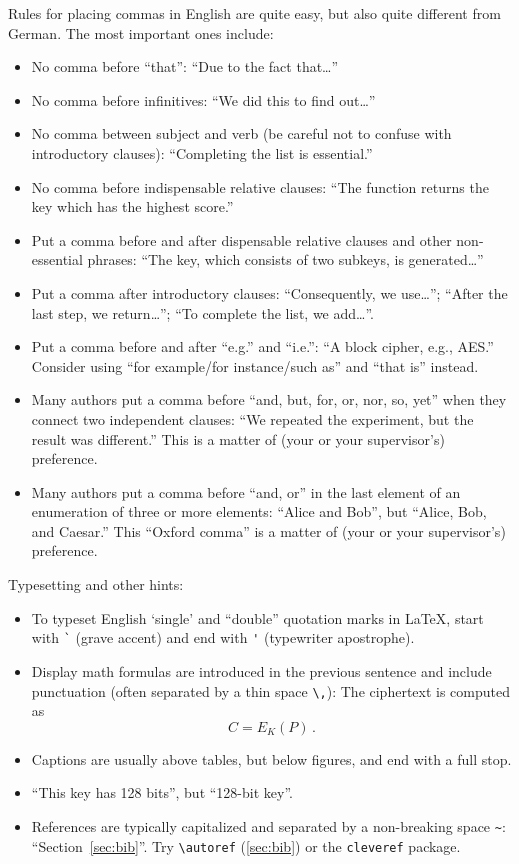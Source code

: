 \documentclass[11pt,
  titlepage=false,
]{scrreprt}
\begin{document}
Rules for placing commas in English are quite easy, but also quite different from German.
The most important ones include:
\begin{itemize}
  \item No comma before ``that'': ``Due to the fact that\dots''
  \item No comma before infinitives: ``We did this to find out\dots''
  \item No comma between subject and verb (be careful not to confuse with introductory clauses): ``Completing the list is essential.''
  \item No comma before indispensable relative clauses: ``The function returns the key which has the highest score.''
  \item Put a comma before and after dispensable relative clauses and other non-essential phrases: ``The key, which consists of two subkeys, is generated\dots''
  \item Put a comma after introductory clauses: ``Consequently, we use\dots''; ``After the last step, we return\dots''; ``To complete the list, we add\dots''.
  \item Put a comma before and after ``e.g.'' and ``i.e.'': ``A block cipher, e.g., AES.''
    Consider using ``for example/for instance/such as'' and ``that is'' instead.
  \item Many authors put a comma before ``and, but, for, or, nor, so, yet'' when they connect two independent clauses: ``We repeated the experiment, but the result was different.''
    This is a matter of (your or your supervisor's) preference.
  \item Many authors put a comma before ``and, or'' in the last element of an enumeration of three or more elements: ``Alice and Bob'', but ``Alice, Bob, and Caesar.''
    This ``Oxford comma'' is a matter of (your or your supervisor's) preference.
\end{itemize}

Typesetting and other hints:
\begin{itemize}
  \item To typeset English `single' and ``double'' quotation marks in \LaTeX, start with \verb|`| (grave accent) and end with \verb|'| (typewriter apostrophe).
  \item Display math formulas are introduced in the previous sentence and include punctuation (often separated by a thin space \verb|\,|): The ciphertext is computed as
    \[C = E_K(P)\,.\]
  \item Captions are usually above tables, but below figures, and end with a full stop.
  \item ``This key has 128 bits'', but ``128-bit key''.
  \item References are typically capitalized and separated by a non-breaking space \verb|~|: ``Section~\ref{sec:bib}''.
    Try \verb|\autoref| (\autoref{sec:bib}) or the \verb|cleveref| package. %
\end{itemize}
\end{document}
